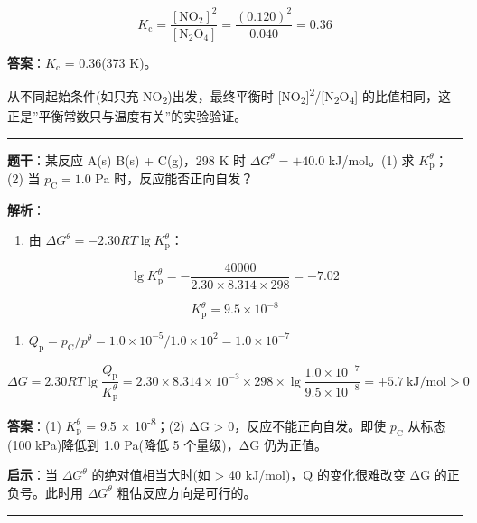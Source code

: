 \[K_{\mathrm c} = \frac{[\mathrm{NO_2}]^2}{[\mathrm{N_2O_4}]} = \frac{(0.120)^2}{0.040} = 0.36\]

\textbf{答案}：\(K_{\mathrm c}\) = 0.36(373 K)。

从不同起始条件(如只充 NO\textsubscript{2})出发，最终平衡时 {[}NO\textsubscript{2}{]}\textsuperscript{2}/{[}N\textsubscript{2}O\textsubscript{4}{]} 的比值相同，这正是''平衡常数只与温度有关''的实验验证。

\begin{center}\rule{0.5\linewidth}{0.5pt}\end{center}

\textbf{题干}：某反应 A(s) \衡 B(s) + C(g)，298 K 时 \(\Delta G^\theta = +40.0\) kJ/mol。(1) 求 \(K_{\mathrm p}^\theta\)；(2) 当 \(p_{\mathrm C} = 1.0\) Pa 时，反应能否正向自发？

\textbf{解析}：

\begin{enumerate}
\def\labelenumi{(\arabic{enumi})}
\tightlist
\item
  由 \(\Delta G^\theta = -2.30RT \lg K_{\mathrm p}^\theta\)：
\end{enumerate}

\[\lg K_{\mathrm p}^\theta = -\frac{40000}{2.30 \times 8.314 \times 298} = -7.02\]

\[K_{\mathrm p}^\theta = 9.5 \times 10^{-8}\]

\begin{enumerate}
\def\labelenumi{(\arabic{enumi})}
\setcounter{enumi}{1}
\tightlist
\item
  \(Q_{\mathrm p} = p_{\mathrm C}/p^\theta = 1.0 \times 10^{-5} / 1.0 \times 10^2 = 1.0 \times 10^{-7}\)
\end{enumerate}

\[\Delta G = 2.30RT\lg\frac{Q_{\mathrm p}}{K_{\mathrm p}^\theta} = 2.30 \times 8.314 \times 10^{-3} \times 298 \times \lg\frac{1.0 \times 10^{-7}}{9.5 \times 10^{-8}} = +5.7\ \mathrm{kJ/mol} > 0\]

\textbf{答案}：(1) \(K_{\mathrm p}^\theta\) = 9.5 × 10\textsuperscript{-8}；(2) ΔG \textgreater{} 0，反应不能正向自发。即使 \(p_{\mathrm C}\) 从标态(100 kPa)降低到 1.0 Pa(降低 5 个量级)，ΔG 仍为正值。

\textbf{启示}：当 \(\Delta G^\theta\) 的绝对值相当大时(如 \textgreater{} 40 kJ/mol)，Q 的变化很难改变 ΔG 的正负号。此时用 \(\Delta G^\theta\) 粗估反应方向是可行的。

\begin{center}\rule{0.5\linewidth}{0.5pt}\end{center}


